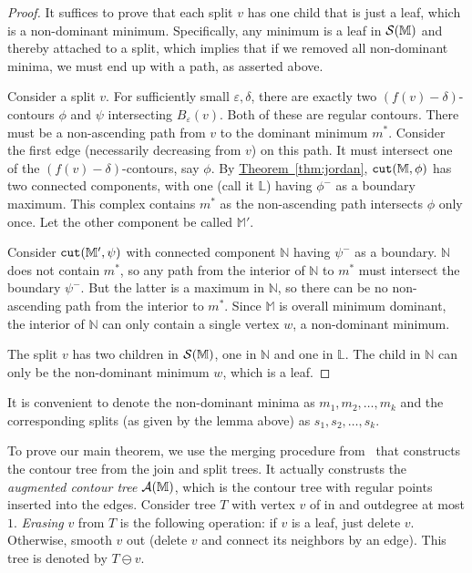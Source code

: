 \documentclass[11pt]{article}
\theoremstyle{definition}
\newcommand{\cA}{{\cal A}}
\newcommand{\cS}{{\cal S}}
\newcommand{\LL}{\mathbb{L}}
\newcommand{\MM}{\mathbb{M}}
\newcommand{\NN}{\mathbb{N}}
\newcommand{\eps}{\varepsilon}
\newcommand{\Thm}[1]{\hyperref[thm:#1]{Theorem~\ref*{thm:#1}}} %
\newcommand{\cut}{{\tt cut}}
\begin{document}
\begin{proof} It suffices to prove that each split $v$ has one child that is just a leaf, which
is a non-dominant minimum.  Specifically, any minimum is a leaf in $\cS(\MM)$ and thereby attached to a split, 
which implies that if we removed all non-dominant minima, we must end up with a path, as asserted above.

Consider a split $v$. For sufficiently small $\eps, \delta$, there are exactly two $(f(v) - \delta)$-contours
$\phi$ and $\psi$ intersecting $B_\eps(v)$. Both of these are regular contours. There must be a non-ascending
path from $v$ to the dominant minimum $m^*$. Consider the first edge (necessarily decreasing from $v$)
on this path. It must intersect one of the $(f(v) - \delta)$-contours, say $\phi$. By \Thm{jordan}, $\cut(\MM,\phi)$ has
two connected components, with one (call it $\LL$) having $\phi^-$ as a boundary maximum. This complex
contains $m^*$ as the non-ascending path intersects $\phi$ only once. Let the other
component be called $\MM'$.

Consider $\cut(\MM',\psi)$ with connected component $\NN$ having $\psi^-$ as a boundary. $\NN$
does not contain $m^*$, so any path from the interior of $\NN$ to $m^*$ must intersect the boundary $\psi^-$.
But the latter is a maximum in $\NN$, so there can be no non-ascending path from the interior to $m^*$.
Since $\MM$ is overall minimum dominant, the interior of $\NN$ can only contain a single vertex $w$, a non-dominant
minimum.

The split $v$ has two children in $\cS(\MM)$, one in $\NN$ and one in $\LL$. The child in $\NN$ can only
be the non-dominant minimum $w$, which is a leaf. 
\end{proof}

It is convenient to denote the non-dominant minima as $m_1, m_2, \ldots, m_k$
and the corresponding splits (as given by the lemma above) as $s_1, s_2, \ldots, s_k$. 

To prove our main theorem, we use the merging procedure from~\cite{csa-cctad-00} that constructs the contour tree
from the join and split trees. 
It actually construsts the \emph{augmented contour tree} $\cA(\MM)$, which
is the contour tree with regular points inserted into the edges. 
Consider tree $T$ with vertex $v$ of in and outdegree at most $1$.
\emph{Erasing} $v$ from $T$ is the following operation: if $v$ is a leaf, just delete $v$. Otherwise, smooth $v$ out
(delete $v$ and connect its neighbors by an edge). This tree is denoted by $T \ominus v$.
\end{document}
